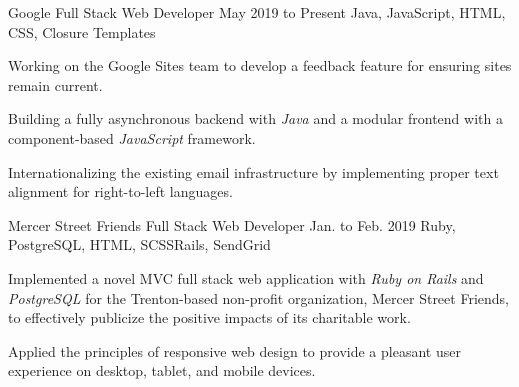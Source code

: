 
\begin{cventry}
    {Google}
    {Full Stack Web Developer}
    {May 2019 to Present}
    {Java, JavaScript, HTML, CSS, Closure Templates}{}
    \begin{cvitems}
        \item Working on the Google Sites team to develop a feedback feature for ensuring sites remain current.
        \item Building a fully asynchronous backend with \textsl{Java} and a modular frontend with a component-based \textsl{JavaScript} framework.
        \item Internationalizing the existing email infrastructure by implementing proper text alignment for right-to-left languages. 
    \end{cvitems}
\end{cventry}

\begin{comment}
    \begin{cventry}
        {The College of New Jersey (TCNJ)}
        {Computer Science Department Tutor}
        {Apr. 2018 to May 2019}
        {Java, C++, C, Ruby, PostgreSQL, Regular Expressions}{Rails}
        \begin{cvitems}
            \item Tutoring TCNJ students in computer science coursework concerning topics such as object-oriented programming, data structures, discrete math, algorithms, computer architecture, operating systems, databases, and software engineering.
        \end{cvitems}
    \end{cventry}
\end{comment}

\begin{cventry}
    {Mercer Street Friends}
    {Full Stack Web Developer}
    {Jan. to Feb. 2019}
    {Ruby, PostgreSQL, HTML, SCSS}{Rails, SendGrid}
    \begin{cvitems}
        \item Implemented a novel MVC full stack web application with \textsl{Ruby on Rails} and \textsl{PostgreSQL} for the Trenton-based non-profit organization, Mercer Street Friends, to effectively publicize the positive impacts of its charitable work.
        \item Applied the principles of responsive web design to provide a pleasant user experience on desktop, tablet, and mobile devices.
    \end{cvitems}
\end{cventry}

